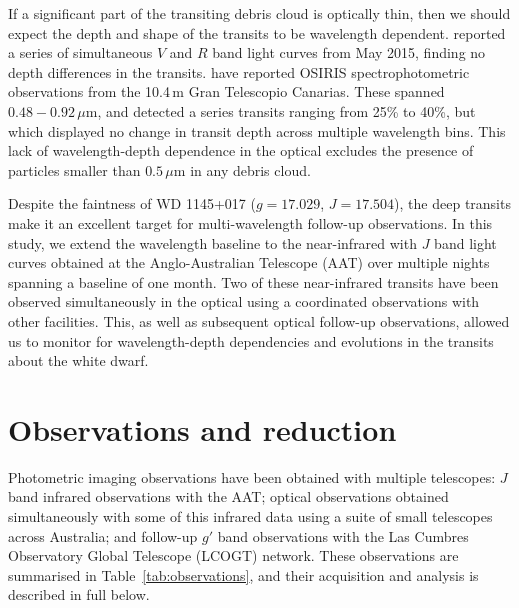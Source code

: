 \documentclass[iop,useAMES,usenatbig]{emulateapj}
\begin{document}
If a significant part of the transiting debris cloud is optically thin, then we should expect the depth and shape of the transits to be wavelength dependent. \citet{2015arXiv151006434C} reported a series of simultaneous $V$ and $R$ band light curves from May 2015, finding no depth differences in the transits. \citet{2016arXiv160308823A} have reported OSIRIS spectrophotometric observations from the 10.4\,m Gran Telescopio Canarias. These spanned $0.48-0.92\,\mu\mathrm{m}$, and detected a series transits ranging from 25\% to 40\%, but which displayed no change in transit depth across multiple wavelength bins. This lack of wavelength-depth dependence in the optical excludes the presence of particles smaller than $ 0.5\,\mu \mathrm{m}$ in any debris cloud. 

Despite the faintness of WD 1145+017 ($g=17.029$, $J=17.504$), the deep transits make it an excellent target for multi-wavelength follow-up observations. In this study, we extend the wavelength baseline to the near-infrared with $J$ band light curves obtained at the Anglo-Australian Telescope (AAT) over multiple nights spanning a baseline of one month. Two of these near-infrared transits have been observed simultaneously in the optical using a coordinated observations with other facilities. This, as well as subsequent optical follow-up observations, allowed us to monitor for wavelength-depth dependencies and evolutions in the transits about the white dwarf.

\section{Observations and reduction}
\label{sec:observations}

Photometric imaging observations have been obtained with multiple telescopes: $J$ band infrared observations with the AAT; optical observations 
obtained simultaneously with some of this infrared data using a suite of small telescopes across Australia; and follow-up $g'$ band observations with the Las Cumbres Observatory Global Telescope (LCOGT) network. These observations are summarised in Table~\ref{tab:observations}, and their acquisition and analysis is described in full below.
\end{document}
